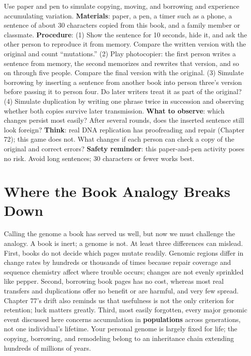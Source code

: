 \begin{shiyan}
Use paper and pen to simulate copying, moving, and borrowing and experience accumulating variation. \textbf{Materials}: paper, a pen, a timer such as a phone, a sentence of about 30 characters copied from this book, and a family member or classmate. \textbf{Procedure}: (1) Show the sentence for 10 seconds, hide it, and ask the other person to reproduce it from memory. Compare the written version with the original and count ``mutations.'' (2) Play photocopier: the first person writes a sentence from memory, the second memorizes and rewrites that version, and so on through five people. Compare the final version with the original. (3) Simulate borrowing by inserting a sentence from another book into person three's version before passing it to person four. Do later writers treat it as part of the original? (4) Simulate duplication by writing one phrase twice in succession and observing whether both copies survive later transmission. \textbf{What to observe}: which changes persist most easily? After several rounds, does the inserted sentence still look foreign? \textbf{Think}: real DNA replication has proofreading and repair (Chapter 72); this game does not. What changes if each person can check a copy of the original and correct errors? \textbf{Safety reminder}: this paper-and-pen activity poses no risk. Avoid long sentences; 30 characters or fewer works best.
\end{shiyan}

\section{Where the Book Analogy Breaks Down}

Calling the genome a book has served us well, but now we must challenge the analogy. A book is inert; a genome is not. At least three differences can mislead. First, books do not decide which pages mutate readily. Genomic regions differ in change rates by hundreds or thousands of times because repair coverage and sequence chemistry affect where trouble occurs; changes are not evenly sprinkled like pepper. Second, borrowing book pages has no cost, whereas most real transfers and duplications offer no benefit or are harmful, and very few spread. Chapter 77's drift also reminds us that usefulness is not the only criterion for retention; luck matters greatly. Third, most easily forgotten, every major genomic event discussed here concerns accumulation in \textbf{populations} across generations, not one individual's lifetime. Your personal genome is largely fixed for life; the copying, borrowing, and remodeling belong to an inheritance chain extending hundreds of millions of years.

